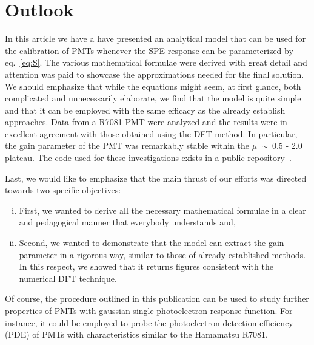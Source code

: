 \documentclass[preprint,12pt]{elsarticle}
\begin{document}
\section{Outlook}
\label{sec:outro}
%
In this article we have a have presented an analytical model that can be used for the calibration of PMTs whenever the SPE response can be parameterized by eq.~\eqref{eq:S}.  
The various mathematical formulae were derived with great detail and attention was paid to showcase the approximations needed for the final solution. 
We should emphasize that while the equations might seem, at first glance, both complicated and unnecessarily elaborate, 
we find that the model is quite simple and that it can be employed with the same efficacy as the already establish approaches. 
Data from a R7081 PMT were analyzed and the results were in excellent agreement with those obtained using the DFT method. 
In particular, the gain parameter of the PMT was remarkably stable within the $\mu$~$\sim$~0.5 - 2.0 plateau. 
The code used for these investigations exists in a public repository~\cite{git}.  

Last, we would like to emphasize that the main thrust of our efforts was directed towards two specific objectives:
\begin{enumerate}[i.]
\item First, we wanted to derive all the necessary mathematical formulae in a clear and pedagogical manner that everybody understands and,
\item Second, we wanted to demonstrate that the model can extract the gain parameter in a rigorous way, similar to those of already established methods. 
In this respect, we showed that it returns figures consistent with the numerical DFT technique.  
\end{enumerate}
Of course, the procedure outlined in this publication can be used to study further properties of PMTs with gaussian single photoelectron response function. 
For instance, it could be employed to probe the photoelectron detection efficiency (PDE) of PMTs with characteristics similar to the Hamamatsu R7081. 




\appendix

\end{document}
